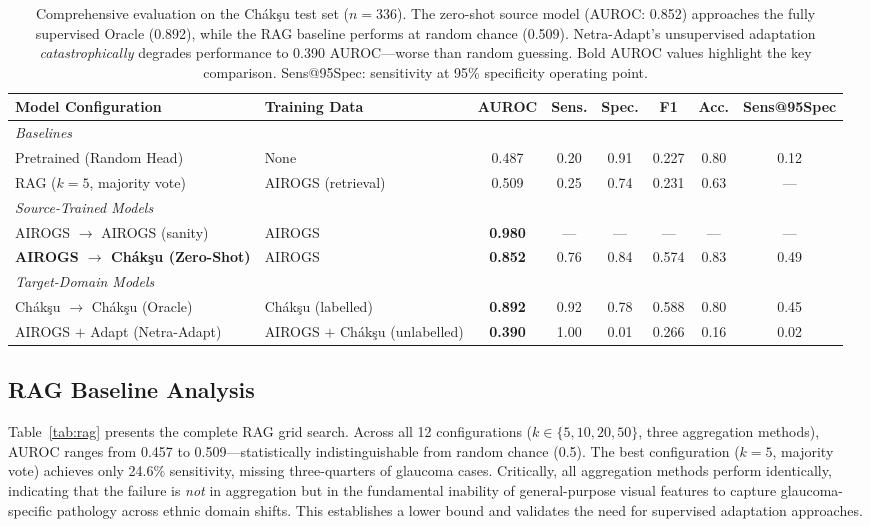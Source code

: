 \documentclass[11pt,twocolumn]{article}
\begin{document}
\begin{table}[t]
\centering
\small
\begin{tabular}{llcccccc}
\toprule
\textbf{Model Configuration} & \textbf{Training Data} & \textbf{AUROC} & \textbf{Sens.} & \textbf{Spec.} & \textbf{F1} & \textbf{Acc.} & \textbf{Sens@95Spec} \\
\midrule
\multicolumn{8}{l}{\emph{Baselines}} \\
\quad Pretrained (Random Head) & None & 0.487 & 0.20 & 0.91 & 0.227 & 0.80 & 0.12 \\
\quad RAG ($k{=}5$, majority vote) & AIROGS (retrieval) & 0.509 & 0.25 & 0.74 & 0.231 & 0.63 & --- \\
\midrule
\multicolumn{8}{l}{\emph{Source-Trained Models}} \\
\quad AIROGS $\to$ AIROGS (sanity) & AIROGS & \textbf{0.980} & --- & --- & --- & --- & --- \\
\quad \textbf{AIROGS $\to$ Ch\'{a}k\c{s}u (Zero-Shot)} & AIROGS & \textbf{0.852} & 0.76 & 0.84 & 0.574 & 0.83 & 0.49 \\
\midrule
\multicolumn{8}{l}{\emph{Target-Domain Models}} \\
\quad Ch\'{a}k\c{s}u $\to$ Ch\'{a}k\c{s}u (Oracle) & Ch\'{a}k\c{s}u (labelled) & \textbf{0.892} & 0.92 & 0.78 & 0.588 & 0.80 & 0.45 \\
\quad AIROGS $+$ Adapt (Netra-Adapt) & AIROGS $+$ Ch\'{a}k\c{s}u (unlabelled) & \textbf{0.390} & 1.00 & 0.01 & 0.266 & 0.16 & 0.02 \\
\bottomrule
\end{tabular}
\caption{Comprehensive evaluation on the Ch\'{a}k\c{s}u test set ($n{=}336$). The zero-shot source model (AUROC: 0.852) approaches the fully supervised Oracle (0.892), while the RAG baseline performs at random chance (0.509). Netra-Adapt's unsupervised adaptation \emph{catastrophically}  degrades performance to 0.390 AUROC---worse than random guessing. Bold AUROC values highlight the key comparison. Sens@95Spec: sensitivity at 95\% specificity operating point.}
\label{tab:results}
\end{table}

\subsection{RAG Baseline Analysis}
\label{sec:rag_results}

Table~\ref{tab:rag} presents the complete RAG grid search. Across all 12 configurations ($k \in \{5, 10, 20, 50\}$, three aggregation methods), AUROC ranges from 0.457 to 0.509---statistically indistinguishable from random chance (0.5). The best configuration ($k{=}5$, majority vote) achieves only 24.6\% sensitivity, missing three-quarters of glaucoma cases. Critically, all aggregation methods perform identically, indicating that the failure is \emph{not} in aggregation but in the fundamental inability of general-purpose visual features to capture glaucoma-specific pathology across ethnic domain shifts. This establishes a lower bound and validates the need for supervised adaptation approaches.
\end{document}
